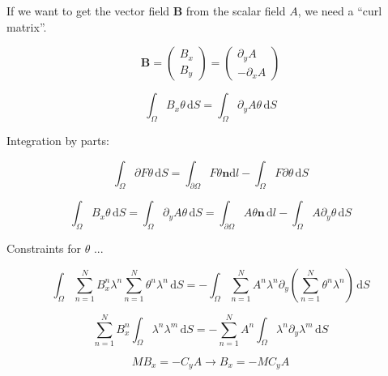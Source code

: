 \noindent If we want to get the vector field $\bm{B}$ from the scalar field $A$, we need a “curl matrix”.

\begin{equation} \label{eq:ap27}
\bm{B} = \begin{pmatrix} B_x \\ B_y \end{pmatrix} = \begin{pmatrix} \partial_y A \\ -\partial_x A \end{pmatrix}
\end{equation}

\begin{equation} \label{eq:ap28}
\int_{\Omega} B_x \theta \,\mathrm{d}S =  \int_{\Omega} \partial_y A \theta \,\mathrm{d}S
\end{equation}

\noindent Integration by parts:

\begin{equation} \label{eq:ap29}
\int_{\Omega} \partial F \theta \,\mathrm{d}S = \int_{\partial\Omega}  F \theta \bm{n} \mathrm{d}l  - \int_{\Omega} F \partial \theta \,\mathrm{d}S
\end{equation}

\begin{equation} \label{eq:ap30}
\int_{\Omega} B_x \theta \,\mathrm{d}S = \int_{\Omega} \partial_y A \theta \,\mathrm{d}S = \int_{\partial\Omega} A \theta \bm{n} \,\mathrm{d}l - \int_{\Omega} A \partial_y \theta \,\mathrm{d}S
\end{equation}

\noindent Constraints for $\theta$ ...

\begin{equation} \label{eq:ap40}
\int_{\Omega} \sum_{n=1}^{N} B_x^n \lambda^n \sum_{n=1}^{N} \theta^n \lambda^n \,\mathrm{d}S = -\int_{\Omega} \sum_{n=1}^{N} A^n \lambda^n \partial_y \left(  \sum_{n=1}^{N} \theta^n \lambda^n \right) \,\mathrm{d}S 
\end{equation}

\begin{equation} \label{eq:ap41}
\sum_{n=1}^{N} B_x^n \int_{\Omega} \lambda^n \lambda^m \,\mathrm{d}S =  -\sum_{n=1}^{N}  A^n \int_{\Omega} \lambda^n  \partial_y \lambda^m  \,\mathrm{d}S 
\end{equation}

\begin{equation} \label{eq:ap42} M B_x = - C_y A \rightarrow B_x = - M C_y A
\end{equation}

